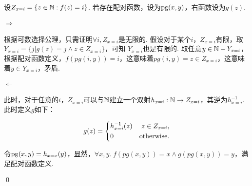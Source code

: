\begin{pf} \rm 
设$Z_{x=i}=\{z\in\mathbb{N}:f(z)=i\}$. 若存在配对函数，设为$\mathrm{pg}(x,y)$，右函数设为$g(z)$. 

\paragraph{$\Rightarrow$}\quad\quad 根据可数选择公理，只需证明$\forall i, Z_{x=i}$是无限的. 假设对于某个$i$，$Z_{x=i}$有限，取$Y_{x=i}=\{j|g(z)=j\wedge z\in Z_{x=i}\}$，可知
$Y_{x=i}$也是有限的. 取任意$y\in \mathbb{N}-Y_{x=i}$，根据配对函数定义，$f(pg(i, y))=i$，这意味着$pg(i,y)=z\in Z_{x=i}$，这意味着$y\in Y_{x=i}$，矛盾.

\paragraph{$\Leftarrow$}\quad\quad 此时，对于任意的$i$，$Z_{x=i}$可以与$\mathbb{N}$建立一个双射$h_{x=i}:\mathbb{N}\rightarrow Z_{x=i}$，其逆为$h_{x=i}^{-1}$. 此时定义$g$如下：

$$ g(z)=\left\{
    \begin{aligned}
    &h^{-1}_{x=i}(z)   & z\in Z_{x=i}, \\
    &0 & \mathrm{otherwise.} \\
    \end{aligned}
\right.
$$

令$\mathrm{pg}(x,y)=h_{x=x}(y)$，显然，$\forall x,y.\;f(pg(x,y))=x \wedge g(pg(x,y))=y$，满足配对函数定义.

    \qed
\end{pf}
